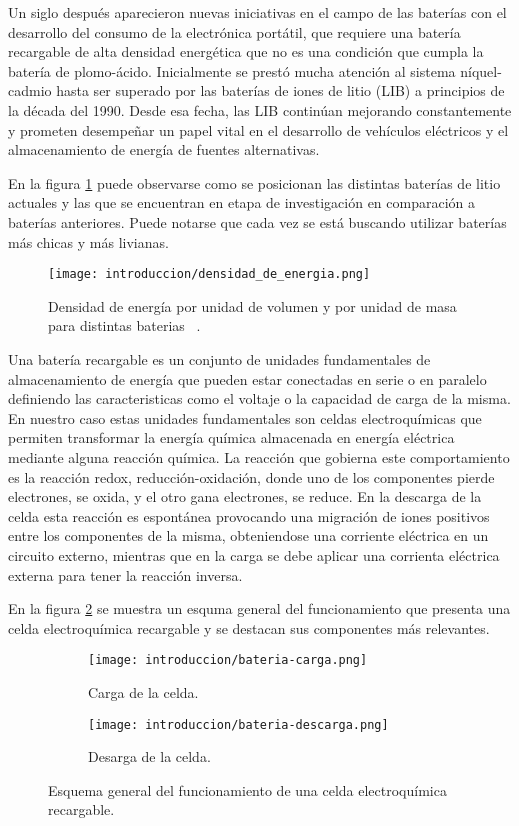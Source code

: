 Un siglo después aparecieron nuevas iniciativas en el campo de las baterías con
el desarrollo del consumo de la electrónica portátil, que requiere una batería 
recargable de alta densidad energética que no es una condición que cumpla la 
batería de plomo-ácido. Inicialmente se prestó mucha atención al sistema 
níquel-cadmio hasta ser superado por las baterías de iones de litio (LIB) a 
principios de la década del 1990. Desde esa fecha, las LIB continúan mejorando
constantemente y prometen desempeñar un papel vital en el desarrollo de vehículos
eléctricos y el almacenamiento de energía de fuentes alternativas. %

En la figura \ref{fig:densidad} puede observarse como se posicionan las distintas
baterías de litio actuales y las que se encuentran en etapa de investigación
en comparación a baterías anteriores. Puede notarse que cada vez se está buscando
utilizar baterías más chicas y más livianas.
\begin{figure}
    \centering
    \texttt{[image: introduccion/densidad\_de\_energia.png]}
    \caption{Densidad de energía por unidad de volumen y por unidad de masa para 
    distintas baterias ~\cite{tarascon2011, placke2017}.}
    \label{fig:densidad}
\end{figure}

Una batería recargable es un conjunto de unidades fundamentales de almacenamiento
de energía que pueden estar conectadas en serie o en paralelo definiendo las 
caracteristicas como el voltaje o la capacidad de carga de la misma. En nuestro 
caso estas unidades fundamentales son celdas electroquímicas que permiten 
transformar la energía química almacenada en energía eléctrica mediante alguna 
reacción química. La reacción que gobierna este comportamiento es la reacción 
redox, reducción-oxidación, donde uno de los componentes pierde electrones, se 
oxida, y el otro gana electrones, se reduce. En la descarga de la celda esta 
reacción es espontánea provocando una migración de iones positivos entre los 
componentes de la misma, obteniendose una corriente eléctrica en un circuito 
externo, mientras que en la carga se debe aplicar una corrienta eléctrica externa
para tener la reacción inversa.

En la figura \ref{fig:bateria} se muestra un esquma general del funcionamiento 
que presenta una celda electroquímica recargable y se destacan sus componentes 
más relevantes.
\begin{figure}[h]
    \centering
    \begin{subfigure}{.8\textwidth}
        \centering
        \texttt{[image: introduccion/bateria-carga.png]}
        \caption{Carga de la celda.}
    \end{subfigure}
    \hfill
    \begin{subfigure}{.8\textwidth}
        \centering
        \texttt{[image: introduccion/bateria-descarga.png]}
        \caption{Desarga de la celda.}
    \end{subfigure}
    \caption{Esquema general del funcionamiento de una celda electroquímica 
    recargable.}
    \label{fig:bateria}
\end{figure}

